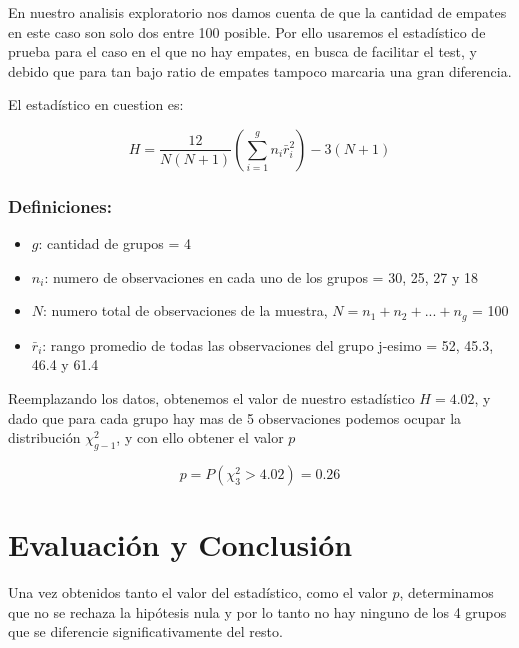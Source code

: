\documentclass{article}
\begin{document}
    En nuestro analisis exploratorio nos damos cuenta de que la cantidad de empates en este caso son solo dos entre 100 posible. Por ello usaremos el estad\'istico de prueba para el caso en el que no hay empates, en busca de facilitar el test, y debido que para tan bajo ratio de empates tampoco marcaria una gran diferencia.

    El estad\'istico en cuestion es:

    \begin{equation}
        H = \frac{12}{N(N+1)}\left(\sum_{i=1}^g n_i \bar{r}_i^2\right) - 3(N+1) 
    \end{equation}

    \subsubsection{Definiciones:}
    
    \begin{itemize}
        \item $g$: cantidad de grupos = 4
        \item $n_i$: numero de observaciones en cada uno de los grupos  = 30, 25, 27 y 18
        \item $N$: numero total de observaciones de la muestra, $N = n_1 + n_2 + ... + n_g$ = 100
        \item $\bar{r}_i$: rango promedio de todas las observaciones del grupo j-esimo = 52, 45.3, 46.4 y 61.4
    \end{itemize}

    Reemplazando los datos, obtenemos el valor de nuestro estad\'istico $H = 4. 02$, y dado que para cada grupo hay mas de 5 observaciones podemos ocupar la distribuci\'on $\chi_{g-1}^2$, y con ello obtener el valor $p$

    \begin{equation}
       p = P(\chi_3^2 > 4.02) = 0.26 
    \end{equation}

    \section{Evaluaci\'on y Conclusi\'on}
    Una vez obtenidos tanto el valor del estad\'istico, como el valor $p$, determinamos que no se rechaza la hip\'otesis nula y por lo tanto no hay ninguno de los 4 grupos que se diferencie significativamente del resto.
\end{document}

